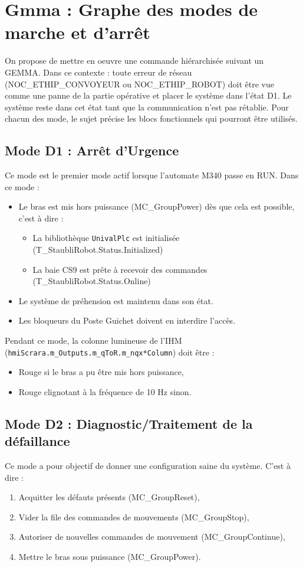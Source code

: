\section{Gmma : Graphe des modes de marche et d'arrêt}

On propose de mettre en oeuvre une commande hiérarchisée suivant un GEMMA. 
Dans ce contexte : toute erreur de réseau (NOC\_ETHIP\_CONVOYEUR ou NOC\_ETHIP\_ROBOT) doit être vue comme une panne de la partie opérative et placer le système dans l'état D1.
Le système reste dans cet état tant que la communication n'est pas rétablie.
Pour chacun des mode, le sujet précise les blocs fonctionnels qui pourront être utilisés. 

\subsection{Mode D1 : Arrêt d'Urgence}
Ce mode est le premier mode actif lorsque l'automate M340 passe en RUN.
Dans ce mode : 
\begin{itemize}
    \item Le bras est mis hors puissance (MC\_GroupPower) dès que cela est possible, c'est à dire : 
    \begin{itemize}
        \item La bibliothèque \texttt{UnivalPlc} est initialisée (T\_StaubliRobot.Status.Initialized) 
        \item La baie CS9 est prête à recevoir des commandes (T\_StaubliRobot.Status.Online)
    \end{itemize}
    \item Le système de préhension est maintenu dans son état.
    \item Les bloqueurs du Poste Guichet doivent en interdire l'accès.
\end{itemize}

Pendant ce mode, la colonne lumineuse de l'IHM (\texttt{hmiScrara.m\_Outputs.m\_qToR.m\_nqx*Column}) doit être :
\begin{itemize}
    \item Rouge si le bras a pu être mis hors puissance,
    \item Rouge clignotant à la fréquence de 10 Hz sinon.
\end{itemize}

\subsection{Mode D2 : Diagnostic/Traitement de la défaillance}
\label{sec:modeD2}
Ce mode a pour objectif de donner une configuration saine du système. C'est à dire : 
\begin{enumerate}
    \item Acquitter les défauts présents (MC\_GroupReset),
    \item Vider la file des commandes de mouvements (MC\_GroupStop),
    \item Autoriser de nouvelles commandes de mouvement (MC\_GroupContinue),
    \item Mettre le bras sous puissance (MC\_GroupPower).
\end{enumerate}

